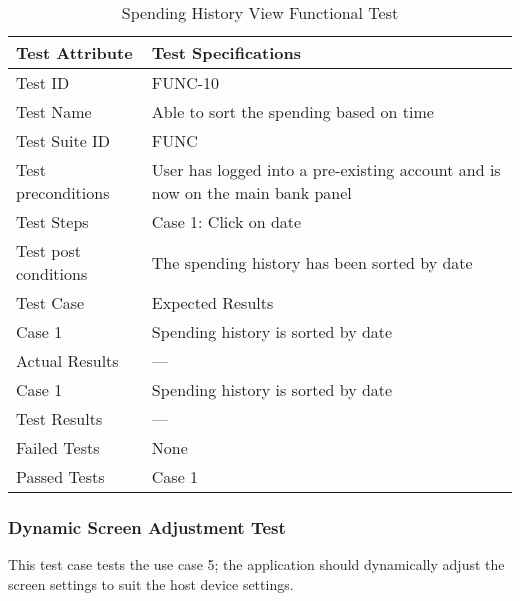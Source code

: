 \documentclass{article}
\begin{document}
\begin{table}[htbp]
\begin{center}
\begin{tabular}{|l | l|}
\hline
Test Attribute & Test Specifications \\
\hline
Test ID & FUNC-10 \\
\hline
Test Name  & Able to sort the spending based on time \\
\hline
Test Suite  ID & FUNC \\
\hline
Test preconditions & User has logged into a pre-existing account and is now on the main bank panel \\
\hline
Test Steps & Case 1: Click on date\\
\hline
Test post conditions & The spending history has been sorted by date \\
\hline
Test Case & Expected Results\\
\hline
Case 1  &  Spending history is sorted by date\\
\hline
Actual Results & ---\\
\hline
Case 1  &  Spending history is sorted by date\\
\hline
Test Results & ---\\
\hline
Failed Tests & None\\
\hline
Passed Tests & Case 1\\
\hline
\end{tabular}
\end{center}
\caption{Spending History View Functional Test}
\end{table}
\label{table:2j}

\clearpage

\subsubsection{Dynamic Screen Adjustment Test}
This test case tests the use case 5; the application should dynamically adjust the screen settings to suit the host device settings.
\end{document}
